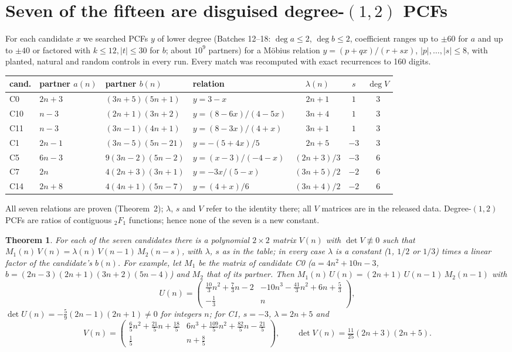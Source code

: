 \documentclass[11pt]{article}
\newtheorem{theorem}{Theorem}
\begin{document}
\section{Seven of the fifteen are disguised \texorpdfstring{degree-$(1,2)$}{degree-(1,2)} PCFs}
For each candidate $x$ we searched PCFs $y$ of lower degree (Batches 12--18: $\deg a\le2$, $\deg b\le2$, coefficient ranges up to
$\pm60$ for $a$ and up to $\pm40$ or factored with $k\le12,|t|\le30$ for $b$; about $10^9$ partners) for a M\"obius relation
$y=(p+qx)/(r+sx)$, $|p|,\dots,|s|\le8$, with planted, natural and random controls in every run. Every match was recomputed with
exact recurrences to 160 digits.
\begin{center}{\small\begin{tabular}{llllccc}\toprule
cand. & partner $a(n)$ & partner $b(n)$ & relation & $\lambda(n)$ & $s$ & $\deg V$\\\midrule
C0 & $2n+3$ & $(3n+5)(5n+1)$ & $y=3-x$ & $2n+1$ & $1$ & 3\\
C10 & $n-3$ & $(2n+1)(3n+2)$ & $y=(8-6x)/(4-5x)$ & $3n+4$ & $1$ & 3\\
C11 & $n-3$ & $(3n-1)(4n+1)$ & $y=(8-3x)/(4+x)$ & $3n+1$ & $1$ & 3\\
C1 & $2n-1$ & $(3n-5)(5n-21)$ & $y=-(5+4x)/5$ & $2n+5$ & $-3$ & 3\\
C5 & $6n-3$ & $9(3n-2)(5n-2)$ & $y=(x-3)/(-4-x)$ & $(2n+3)/3$ & $-3$ & 6\\
C7 & $2n$ & $4(2n+3)(3n+1)$ & $y=-3x/(5-x)$ & $(3n+5)/2$ & $-2$ & 6\\
C14 & $2n+8$ & $4(4n+1)(5n-7)$ & $y=(4+x)/6$ & $(3n+4)/2$ & $-2$ & 6\\\bottomrule
\end{tabular}}\end{center}
All seven relations are proven (Theorem~2); $\lambda$, $s$ and $V$ refer to the identity there; all $V$ matrices are in the released data.
Degree-$(1,2)$ PCFs are ratios of contiguous ${}_2F_1$ functions; hence none of the seven is a new constant.
\begin{theorem}
For each of the seven candidates there is a polynomial $2\times2$ matrix $V(n)$ with $\det V\not\equiv0$ such that
$M_1(n)\,V(n)=\lambda(n)\,V(n-1)\,M_2(n-s)$, with $\lambda$, $s$ as in the table; in every case $\lambda$ is a constant ($1$, $1/2$ or
$1/3$) times a linear factor of the candidate's $b(n)$. For example, let $M_1$ be the matrix of candidate C0 ($a=4n^2+10n-3$, $b=(2n-3)(2n+1)(3n+2)(5n-4)$) and $M_2$ that of its partner. Then
$M_1(n)\,U(n)=(2n+1)\,U(n-1)\,M_2(n-1)$ with
\[U(n)=\begin{pmatrix}\frac{10}{3}n^2+\frac73n-2 & -10n^3-\frac{41}{3}n^2+6n+\frac53\\[2pt] -\frac13 & n\end{pmatrix},\]
$\det U(n)=-\frac59(2n-1)(2n+1)\neq0$ for integers $n$; for C1, $s=-3$, $\lambda=2n+5$ and
\[V(n)=\begin{pmatrix}\frac65n^2+\frac{21}5n+\frac{18}5 & 6n^3+\frac{109}5n^2+\frac{82}5n-\frac{21}5\\[2pt] \frac15 & n+\frac85\end{pmatrix},\qquad
\det V(n)=\tfrac{11}{25}(2n+3)(2n+5).\]
\end{theorem}
\end{document}
